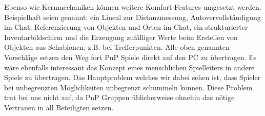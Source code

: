 Ebenso wie Kernmechaniken können weitere Komfort-Features umgesetzt werden. Beispielhaft seien genannt:
ein Lineal zur Distanzmessung,
Autovervollständigung im Chat,
Referenzierung von Objekten und Orten im Chat,
ein strukturierter Inventarbildschirm und
die Erzeugung zufälliger Werte beim Erstellen von Objekten aus Schablonen, z.B. bei Trefferpunkten.\newline
Alle oben genannten Vorschläge setzen den Weg fort PnP Spiele direkt auf den PC zu übertragen. Es wäre ebenfalls interessant das Konzept eines menschlichen Spielleiters in andere Spiele zu übertragen. Das Hauptproblem welches wir dabei sehen ist, dass Spieler bei unbegrenzten Möglichkeiten unbegrenzt schummeln können. Diese Problem trat bei uns nicht auf, da PnP Gruppen üblicherweise ohnehin das nötige Vertrauen in all Beteiligten setzen.
